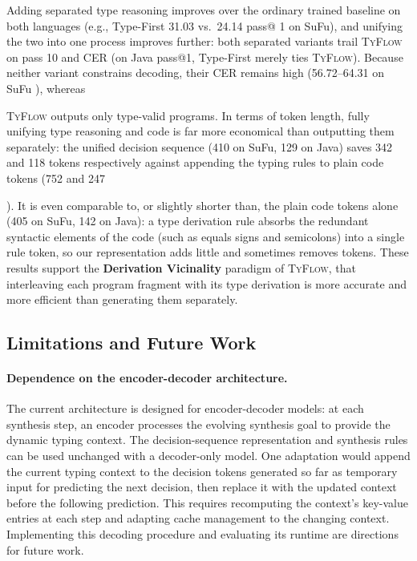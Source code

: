 \documentclass[manuscript,screen]{acmart}
\newcommand{\toolname}[1]{\textsc{#1}}
\newcommand{\mainname}{\toolname{TyFlow}\xspace}
\begin{document}
  {\color{revblue}Adding separated type reasoning improves over the ordinary trained baseline on both languages (e.g., Type-First 31.03 vs.\ 24.14 } pass@ {\color{revblue}1 on SuFu), and unifying the two into one process improves further: both separated variants trail }\mainname{} {\color{revblue}on pass} 10  %
 and    {\color{revblue}CER (on Java pass@1, Type-First merely ties }\mainname{}{\color{revblue}).
Because neither variant constrains decoding, their CER remains high (56.72--64.31 on SuFu} ), whereas  %

  \mainname{} {\color{revblue}outputs only type-valid programs.
In terms of token length, fully unifying type reasoning and code is far more economical than outputting them separately: the unified decision sequence (410 on SuFu, } 129    {\color{revblue}on Java) saves 342 and 118 tokens respectively against appending the typing rules to plain code tokens (752 and } 247 %

  {\color{revblue}).
It is even comparable to, or slightly shorter than, the plain code tokens alone (405 on SuFu, 142 on Java): a type derivation rule absorbs the redundant syntactic elements of the code (such as equals signs and semicolons) into a single rule token, so our representation adds little and sometimes removes tokens.
These results support the } \textbf{Derivation Vicinality} paradigm    {\color{revblue}of } \mainname   {\color{revblue}, that interleaving each program fragment with its type derivation is more accurate and more efficient than generating them separately.
}

\subsection{{\color{revblue}Limitations and Future Work}} \label{sec:limitations}
\paragraph{{\color{revblue}Dependence on the encoder-decoder architecture.}}
{\color{revblue}The current architecture is designed for encoder-decoder models: at each synthesis step, an encoder processes the evolving synthesis goal to provide the dynamic typing context.
The decision-sequence representation and synthesis rules can be used unchanged with a decoder-only model. One adaptation would append the current typing context to the decision tokens generated so far as temporary input for predicting the next decision, then replace it with the updated context before the following prediction. This requires recomputing the context's key-value entries at each step and adapting cache management to the changing context. Implementing this decoding procedure and evaluating its runtime are directions for future work.
}
\end{document}
